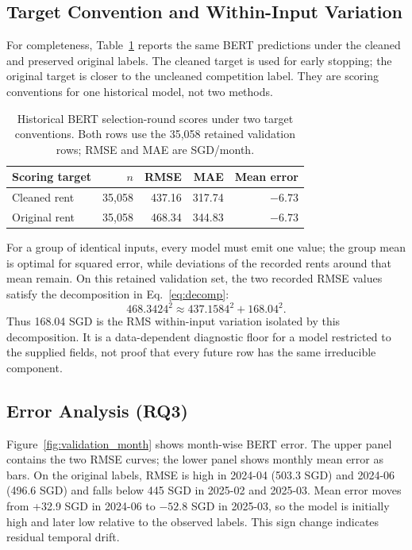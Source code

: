 \subsection{Target Convention and Within-Input Variation}
For completeness, Table~\ref{tab:validation_results} reports the same BERT predictions under the cleaned and preserved original labels.  The cleaned target is used for early stopping; the original target is closer to the uncleaned competition label.  They are scoring conventions for one historical model, not two methods.

\begin{table}[t]
\caption{Historical BERT selection-round scores under two target conventions.  Both rows use the 35,058 retained validation rows; RMSE and MAE are SGD/month.}
\label{tab:validation_results}
\centering
\footnotesize
\begin{tabular}{@{}lrrrr@{}}
\toprule
Scoring target & $n$ & RMSE & MAE & Mean error \\
\midrule
Cleaned rent & 35,058 & 437.16 & 317.74 & $-6.73$ \\
Original rent & 35,058 & 468.34 & 344.83 & $-6.73$ \\
\bottomrule
\end{tabular}
\end{table}

For a group of identical inputs, every model must emit one value; the group mean is optimal for squared error, while deviations of the recorded rents around that mean remain.  On this retained validation set, the two recorded RMSE values satisfy the decomposition in Eq.~\ref{eq:decomp}:
\begin{equation}
\label{eq:decomp}
468.3424^2 \approx 437.1584^2 + 168.04^2.
\end{equation}
Thus 168.04 SGD is the RMS within-input variation isolated by this decomposition.  It is a data-dependent diagnostic floor for a model restricted to the supplied fields, not proof that every future row has the same irreducible component.

\subsection{Error Analysis (RQ3)}
Figure~\ref{fig:validation_month} shows month-wise BERT error.  The upper panel contains the two RMSE curves; the lower panel shows monthly mean error as bars.  On the original labels, RMSE is high in 2024-04 (503.3 SGD) and 2024-06 (496.6 SGD) and falls below 445 SGD in 2025-02 and 2025-03.  Mean error moves from +32.9 SGD in 2024-06 to $-52.8$ SGD in 2025-03, so the model is initially high and later low relative to the observed labels.  This sign change indicates residual temporal drift.

